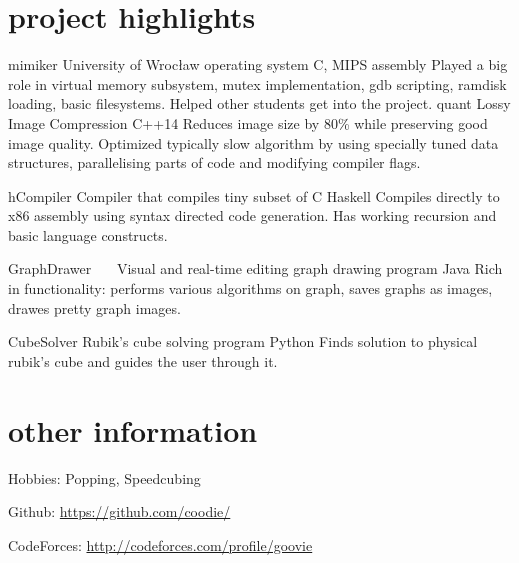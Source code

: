 \documentclass[]{twentysecondcv}
\begin{document}
\section{project highlights}
\begin{twenty}
	\twentyitem
	{mimiker}
	{University of Wrocław operating system}
	{C, MIPS assembly}
	{ Played a big role in virtual memory subsystem, mutex implementation, gdb scripting, ramdisk loading, basic filesystems. Helped other students get into the project. }
	\twentyitem
	{quant}
	{Lossy Image Compression}
	{C++14}
	{Reduces image size by 80\% while preserving good image quality.
	Optimized typically slow algorithm by using specially tuned data structures, parallelising parts of code and modifying compiler flags.
	}
	
	\twentyitem
	{hCompiler}
	{Compiler that compiles tiny subset of C}
	{Haskell}
	{Compiles directly to x86 assembly using syntax directed code generation. Has working recursion and basic language constructs. }
	
	\twentyitem
	{GraphDrawer\ \ \ }
	{Visual and real-time editing graph drawing program}
	{Java}
	{Rich in functionality: performs various algorithms on graph, saves graphs as images, drawes pretty graph images.}
	
	\twentyitem
	{CubeSolver}
	{Rubik's cube solving program}
	{Python}
	{Finds solution to physical rubik's cube and guides the user through it. }
	
\end{twenty}


\section{other information}
Hobbies: Popping, Speedcubing

Github: \url{https://github.com/coodie/}

CodeForces: \url{http://codeforces.com/profile/goovie}


\end{document}
